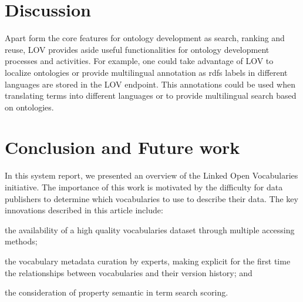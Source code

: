 \documentclass{iosart2c}
\begin{document}
\section{Discussion}

Apart form the core features for ontology development as search, ranking and reuse, LOV provides aside useful functionalities  for ontology development processes and activities. For example, one could take advantage of LOV to localize ontologies or provide multilingual annotation as rdfs labels in different languages are stored in the LOV endpoint. This annotations could be used when translating terms into different languages or to provide multilingual search based on ontologies. 
		
%							
%   


\section{Conclusion and Future work}
\label{sec:conclusion}
In this system report, we presented an overview of the Linked Open Vocabularies initiative. The importance of this work is motivated by the difficulty for data publishers to determine which vocabularies to use to describe their data. The key innovations described in this article include: 
\begin{inparaenum}[1)] 
	\item the availability of a high quality vocabularies dataset through multiple accessing methods;
	\item the vocabulary metadata curation by experts, making explicit for the first time the relationships between vocabularies and their version history; and
	\item the consideration of property semantic in term search scoring.
\end{inparaenum}
\end{document}
